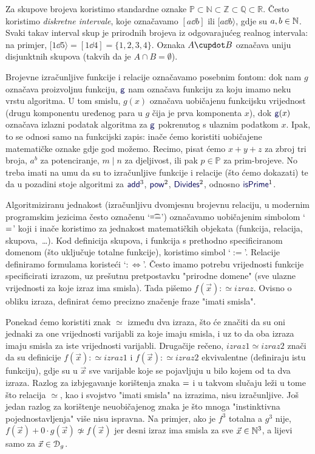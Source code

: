 Za skupove brojeva koristimo standardne oznake $\mathbb P\subset \mathbb N\subset \mathbb Z\subset \mathbb Q\subset \mathbb R$. Često koristimo \emph{diskretne intervale}, koje označavamo $[a\dd b]$ ili $[a\dd b\rangle$, gdje su $a,b\in{\mathbb N}$. Svaki takav interval skup je prirodnih brojeva iz odgovarajućeg realnog intervala: na primjer, $[1\dd 5\rangle=[1\dd 4]=\{1,2,3,4\}$. Oznaka $A\dcup B$ označava uniju disjunktnih skupova (takvih da je $A\cap B=\emptyset$).

Brojevne izračunljive funkcije i relacije označavamo posebnim fontom: dok nam $g$ označava proizvoljnu funkciju, $\f{g}$ nam označava funkciju za koju imamo neku vrstu algoritma. U tom smislu, $g(x)$ označava uobičajenu funkcijsku vrijednost (drugu komponentu uređenog para u $g$ čija je prva komponenta $x$), dok $\f{g}(x)$ označava izlazni podatak algoritma za $\f{g}$ pokrenutog s ulaznim podatkom $x$. Ipak, to se odnosi samo na funkcijski zapis: inače ćemo koristiti uobičajene matematičke oznake gdje god možemo. Recimo, pisat ćemo $x+y+z$ za zbroj tri broja, $a^b$ za potenciranje, $m\mid n$ za djeljivost, ili pak $p\in\mathbb P$ za prim-brojeve. No treba imati na umu da su to izračunljive funkcije i relacije (što ćemo dokazati) te da u pozadini stoje algoritmi za $\f{add}^3$, $\f{pow}^2$, $\f{Divides}^2$, odnosno $\f{isPrime}^1$.

\begin{napomena}[{name=[jednakost i parcijalna jednakost]}]\label{nap:parcdef}
    Algoritmiziranu jednakost (izračunljivu dvomjesnu brojevnu relaciju, u modernim programskim jezicima često označenu \enquote*{\t{==}}) oz\-na\-ča\-va\-mo uobičajenim simbolom \enquote*{$=$} koji i inače koristimo za jednakost matematičkih objekata (funkcija, relacija, skupova,~\ldots). Kod definicija skupova, i funkcija s prethodno specificiranom domenom (što uključuje totalne funkcije), koristimo simbol \enquote*{$:=$}. Relacije definiramo formulama koristeći \enquote*{$:\Longleftrightarrow$}. Često imamo potrebu vrijednosti funkcije specificirati izrazom, uz prešutnu pretpostavku "prirodne domene" (sve ulazne vrijednosti za koje izraz ima smisla). Tada pišemo $f(\vec x):\simeq izraz$. Ovisno o obliku izraza, definirat ćemo precizno značenje fraze "imati smisla".
\end{napomena}

Ponekad ćemo koristiti znak $\simeq$ između dva izraza, što će značiti da su oni jednaki za one vrijednosti varijabli za koje imaju smisla, i uz to da oba izraza imaju smisla za iste vrijednosti varijabli. Drugačije rečeno, $izraz1\simeq izraz2$ znači da su definicije $f(\vec x):\simeq izraz1$ i $f(\vec x):\simeq izraz2$ ekvivalentne (definiraju istu funkciju), gdje su u $\vec x$ sve varijable koje se pojavljuju u bilo kojem od ta dva izraza. Razlog za izbjegavanje korištenja znaka $=$ i u takvom slučaju leži u tome što relacija $\simeq$, kao i svojstvo "imati smisla" na izrazima, nisu izračunljive. Još jedan razlog za korištenje neuobičajenog znaka je što mnoga "instinktivna pojednostavljenja" više nisu ispravna. Na primjer, ako je $f^3$ totalna a $g^3$ nije, $f(\vec x)+0\cdot g(\vec x)\nsimeq f(\vec x)$ jer desni izraz ima smisla za sve $\vec x\in{\mathbb N}^3$, a lijevi samo za $\vec x\in\mathcal D_{g}$.

